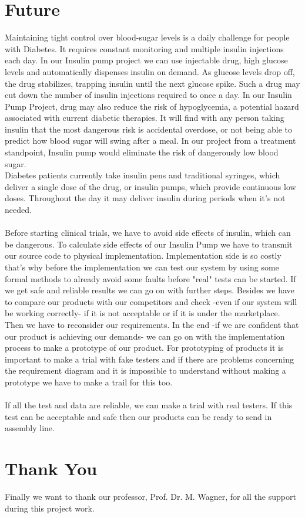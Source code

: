 \documentclass[pdflatex,a4paper,11pt,english]{scrreprt}
\begin{document}
\section{Future}
Maintaining tight control over blood-sugar levels is a daily challenge for people with Diabetes. It requires constant monitoring and multiple insulin injections each day. In our Insulin pump project we can use injectable drug, high glucose levels and automatically dispenses insulin on demand. As glucose levels drop off, the drug stabilizes, trapping insulin until the next glucose spike. Such a drug may cut down the number of insulin injections required to once a day.
In our Insulin Pump Project, drug may also reduce the risk of hypoglycemia, a potential hazard associated with current diabetic therapies. It will find with any person taking insulin that the most dangerous risk is accidental overdose, or not being able to predict how blood sugar will swing after a meal. In our project from a treatment standpoint, Insulin pump would eliminate the risk of dangerously low blood sugar.
\\ 
Diabetes patients currently take insulin pens and traditional syringes, which deliver a single dose of the drug, or insulin pumps, which provide continuous low doses. Throughout the day it may deliver insulin during periods when it's not needed.
\\ \\ 
Before starting clinical trials, we have to avoid side effects of insulin, which can be dangerous. To calculate side effects of our Insulin Pump we have to transmit our source code to physical implementation. Implementation side is so costly that's why before the implementation we can test our system by using some formal methods to already avoid some faults before "real" tests can be started. If  we get safe and reliable results we can go on with further steps. Besides we have to compare our products with our competitors and check -even if our system will be working correctly- if it is not acceptable or if it is under the marketplace. Then we have to reconsider our requirements. In the end -if we are confident that our product is achieving our demands- we can go on with the implementation process to make a prototype of our product. For prototyping of products it is important to make a trial with fake testers and if there are problems concerning the requirement diagram and it is impossible to understand without making a prototype we have to make a trail for this too.
\\ \\
If all the test and data are reliable, we can make a trial with real testers. If this test can be acceptable and safe then our products can be ready to send in assembly line.    

\section{Thank You}
Finally we want to thank our professor, Prof. Dr. M. Wagner, for all the support during this project work.


        
\end{document}
